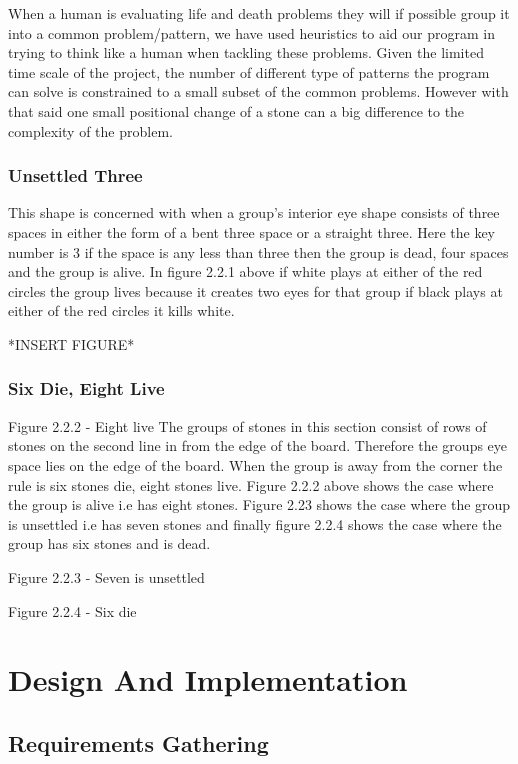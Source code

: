 \documentclass{l3proj}
\begin{document}
When a human is evaluating life and death problems they will if possible group it into a common problem/pattern, we have used heuristics to aid our program in trying to think like a human when tackling these problems. Given the limited time scale of the project, the number of different type of patterns the program can solve is constrained to a small subset of the common problems. However with that said one small positional change of a stone can a big difference to the complexity of the problem. 


\subsection{Unsettled Three}

This shape is concerned with when a group’s interior eye shape consists of three spaces in either the form of a bent three space or a straight three. Here the key number is 3 if the space is any less than three then the group is dead,  four spaces and the group is alive. In figure 2.2.1 above if white plays at either of the red circles the group lives because it creates two eyes for that group if black plays at either of the red circles it kills white.

*INSERT FIGURE*

\subsection{Six Die, Eight Live}

		Figure 2.2.2 - Eight live 
The groups of stones in this section consist of rows of stones on the second line in from the edge of the board. Therefore the groups eye space lies on the edge of the board. When the group is away from the corner the rule is six stones die, eight stones live. Figure 2.2.2 above shows the case where the group is alive i.e has eight stones. Figure 2.23 shows the case where the group is unsettled i.e has seven stones and finally figure 2.2.4 shows the case where the group has six stones and is dead.

Figure 2.2.3 - Seven is unsettled

Figure 2.2.4 - Six die

\chapter{Design And Implementation}
\label{design}

\section{Requirements Gathering}
\end{document}
